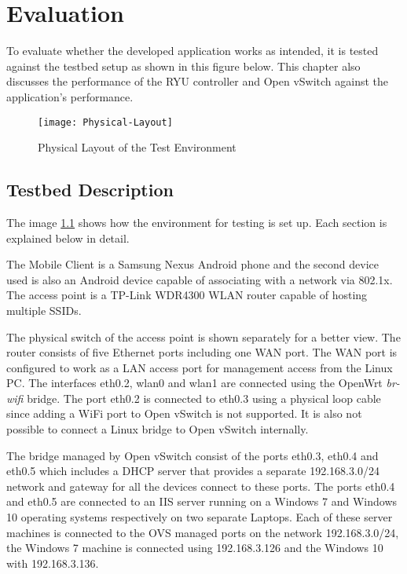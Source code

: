 \chapter{Evaluation}\label{ch:Evaluation}
To evaluate whether the developed application works as intended, it is tested against the testbed setup as shown in this figure below. This chapter also discusses the performance of the RYU controller and Open vSwitch against the application’s performance.

  \begin{figure}
	\centering
	\texttt{[image: Physical-Layout]}
	\caption {Physical Layout of the Test Environment}
	\label{fig:test-layout}
	\vspace{-10pt}
  \end{figure}

\section{Testbed Description}
The image \ref{fig:test-layout} shows how the environment for testing is set up. Each section is explained below in detail.

The Mobile Client is a Samsung Nexus Android phone and the second device used is also an Android device capable of associating with a network via 802.1x. The access point is a TP-Link WDR4300 WLAN router capable of hosting multiple SSIDs. 

The physical switch of the access point is shown separately for a better view. The router consists of five Ethernet ports including one WAN port. The WAN port is configured to work as a LAN access port for management access from the Linux PC. The interfaces eth0.2, wlan0 and wlan1 are connected using the OpenWrt \textit{br-wifi} bridge. The port eth0.2 is connected to eth0.3 using a physical loop cable since adding a WiFi port to Open vSwitch is not supported. It is also not possible to connect a Linux bridge to Open vSwitch internally.

The bridge managed by Open vSwitch consist of the ports eth0.3, eth0.4 and eth0.5 which includes a DHCP server that provides a separate 192.168.3.0/24 network and gateway for all the devices connect to these ports. The ports eth0.4 and eth0.5 are connected to an IIS server running on a Windows 7 and Windows 10 operating systems respectively on two separate Laptops. Each of these server machines is connected to the OVS managed ports on the network 192.168.3.0/24, the Windows 7 machine is connected using 192.168.3.126 and the Windows 10 with 192.168.3.136.

